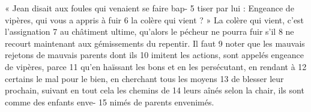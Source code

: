 « Jean disait aux foules qui venaient se faire bap-	 
5	 	tiser par lui : Engeance de vipères, qui vous a appris à fuir	 
6	 	la colère qui vient ? » La colère qui vient, c'est l'assignation	 
7	 	au châtiment ultime, qu'alors le pécheur ne pourra fuir s'il	 
8	 	ne recourt maintenant aux gémissements du repentir. Il faut	 
9	 	noter que les mauvais rejetons de mauvais parents dont ils	 
10	 	imitent les actions, sont appelés engeance de vipères, parce	 
11	 	qu'en haïssant les bons et en les persécutant, en rendant à	 
12	 	certains le mal pour le bien, en cherchant tous les moyens	 
13	 	de blesser leur prochain, suivant en tout cela les chemins de	 
14	 	leurs aînés selon la chair, ils sont comme des enfants enve-	 
15	 	nimés de parents envenimés.